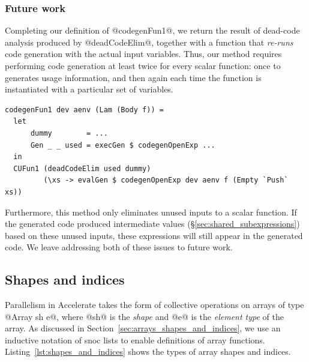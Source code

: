 \subsubsection{Future work}

Completing our definition of @codegenFun1@, we return the result of
dead-code analysis produced by @deadCodeElim@, together with a function
that \emph{re-runs} code generation with the actual input variables. Thus, our
method requires performing code generation at least twice for every scalar
function: once to generates usage information, and then again each time the
function is instantiated with a particular set of variables.
%
\begin{lstlisting}[style=haskell,firstnumber=7]
codegenFun1 dev aenv (Lam (Body f)) =
  let
      dummy        = ...
      Gen _ _ used = execGen $ codegenOpenExp ...
  in
  CUFun1 (deadCodeElim used dummy)
         (\xs -> evalGen $ codegenOpenExp dev aenv f (Empty `Push` xs))
\end{lstlisting}

Furthermore, this method only eliminates unused inputs to a scalar function. If
the generated code produced intermediate values
(\S\ref{sec:shared_subexpressions}) based on these unused inputs, these
expressions will still appear in the generated code. We leave addressing both of
these issues to future work.


\subsection{Shapes and indices}

\cg[shapes|(]{}

Parallelism in Accelerate takes the form of collective operations on arrays of
type @Array sh e@, where @sh@ is the \emph{shape} and @e@ is the \emph{element
type} of the array. As discussed in Section~\ref{sec:arrays_shapes_and_indices},
we use an inductive notation of snoc lists to enable 
definitions of array functions. Listing~\ref{lst:shapes_and_indices} shows the
types of array shapes and indices.

